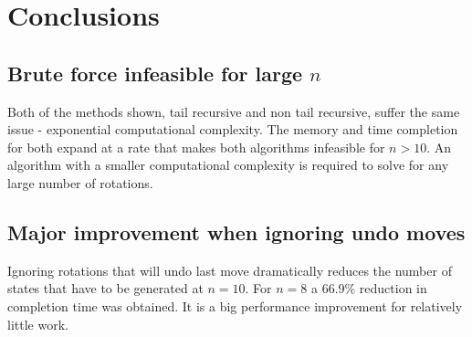 \documentclass[]{article}
\begin{document}
\section{Conclusions}
\subsection{Brute force infeasible for large \(n\)}
 Both of the methods shown, tail recursive and non tail recursive, suffer the same issue - exponential computational complexity. The memory and time completion for both expand at a rate that makes both algorithms infeasible for \(n>10\). An algorithm with a smaller computational complexity is required to solve for any large number of rotations.
\subsection{Major improvement when ignoring undo moves}
Ignoring rotations that will undo last move dramatically reduces the number of states that have to be generated at \(n = 10\). For \(n = 8\) a 66.9\% reduction in completion time was obtained. It is a big performance improvement for relatively little work.
\end{document}
